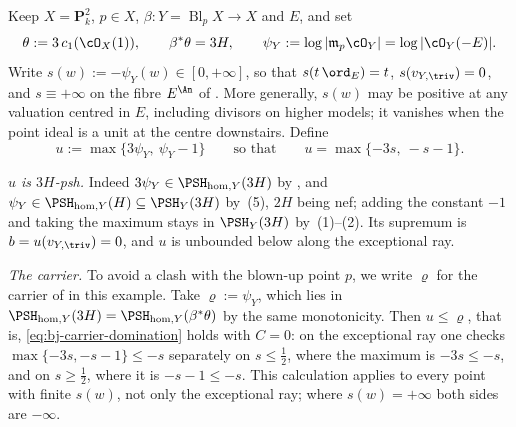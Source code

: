 \begin{example}
\label{ex:ch39-carrier-pair}
Keep $X=\mathbf P^2_k$, $p\in X$, $\beta:Y=\operatorname{Bl}_pX\to X$
and $E$, and set
\[
 \theta:=3\,c_1(\cO_X(1)),\qquad
 \beta^*\theta=3H,\qquad
 \psi_Y:=\log|\mathfrak m_p\cO_Y|=\log|\cO_Y(-E)| .
\]
Write $s(w):=-\psi_Y(w)\in[0,+\infty]$, so that $s(t\,\ord_E)=t$,
$s(v_{Y,\triv})=0$, and $s\equiv+\infty$ on the fibre $E^{\An}$
of .  More generally, $s(w)$ may be positive
at any valuation centred in $E$, including divisors on higher models;
it vanishes when the point ideal is a unit at the centre downstairs.
Define
\[
 u:=\max\{3\psi_Y,\ \psi_Y-1\}
 \qquad\text{so that}\qquad
 u=\max\{-3s,\ -s-1\}.
\tag{39.45}\label{eq:ch39-carrier-u}
\]

\emph{$u$ is $3H$-psh.}  Indeed $3\psi_Y\in\PSH_{\mathrm{hom},Y}(3H)$
by , and
$\psi_Y\in\PSH_{\mathrm{hom},Y}(H)\subseteq\PSH_Y(3H)$ by
\,(5), $2H$ being nef; adding the
constant $-1$ and taking the maximum stays in $\PSH_Y(3H)$ by
\,(1)--(2).  Its supremum is
$b=u(v_{Y,\triv})=0$, and $u$ is unbounded below along the exceptional
ray.

\emph{The carrier.}  To avoid a clash with the blown-up point $p$, we
write $\varrho$ for the carrier of  in
this example.  Take $\varrho:=\psi_Y$, which lies in
$\PSH_{\mathrm{hom},Y}(3H)=\PSH_{\mathrm{hom},Y}(\beta^*\theta)$ by the
same monotonicity.  Then $u\le\varrho$, that is,
\eqref{eq:bj-carrier-domination} holds with $C=0$: on the exceptional ray
one checks $\max\{-3s,-s-1\}\le-s$ separately on $s\le\frac12$, where
the maximum is $-3s\le-s$, and on $s\ge\frac12$, where it is
$-s-1\le-s$.  This calculation applies to every point with finite
$s(w)$, not only the exceptional ray; where $s(w)=+\infty$ both sides
are $-\infty$.


\end{example}
